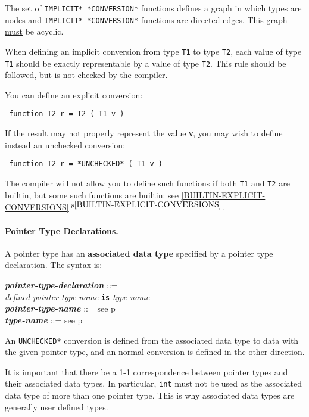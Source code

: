 \documentclass[12pt]{article}
\newcommand{\subsubsubsection}[1]{\paragraph[#1]{#1.}}
\newcommand{\TT}[1]{{\tt \bfseries #1}}
\newcommand{\key}[1]{{\rm \bfseries #1}}
\newcommand{\ttkey}[1]{{\tt \bfseries #1}}
\newcommand{\emkey}[1]{{\em \bfseries #1}}
\newcommand{\itemref}[1]{\ref{#1}$\,^{p\pageref{#1}}$}
\newcommand{\pagref}[1]{p\pageref{#1}}
\newenvironment{indpar}[1][0.3in]%
	{\begin{list}{}%
		     {\setlength{\itemsep}{0in}%
		      \setlength{\topsep}{0in}%
		      \setlength{\parsep}{1ex}%
		      \setlength{\labelwidth}{#1}%
		      \setlength{\leftmargin}{#1}%
		      \addtolength{\leftmargin}{\labelsep}}%
	 \item}%
	{\end{list}}
\begin{document}
The set of {\tt *IMPLICIT* *CONVERSION*} functions defines
a graph in which types are nodes and {\tt *IMPLICIT* *CONVERSION*}
functions are directed edges.  This graph \underline{must} be
acyclic.

When defining an implicit conversion from type {\tt T1} to type
{\tt T2}, each value of type {\tt T1} should be exactly representable
by a value of type {\tt T2}.  This rule should be followed, but
is not checked by the compiler.

You can define an explicit conversion:
\begin{indpar} \tt
function T2 r = T2 ( T1 v )
\end{indpar}
If the result may not properly represent the value {\tt v}, you
may wish to define instead an unchecked conversion:
\begin{indpar} \tt
function T2 r = *UNCHECKED* ( T1 v )
\end{indpar}
The compiler will not allow you to define such functions if both
{\tt T1} and {\tt T2} are builtin, but some such functions are
builtin: see \itemref{BUILTIN-EXPLICIT-CONVERSIONS}.





\subsubsubsection{Pointer Type Declarations}
\label{POINTER-TYPE-DECLARATIONS}

A pointer type has an
\key{associated data type}\label{POINTER-ASSOCIATE}
specified by a pointer type declaration.  The syntax is:

\begin{indpar}
\emkey{pointer-type-declaration}\label{POINTER-TYPE-DECLARATION} ::= \\
\hspace*{0.5in}\ttkey{pointer type} {\em defined-pointer-type-name}
	       \TT{is} {\em type-name}
\\[0.5ex]
\emkey{pointer-type-name} ::= see \pagref{POINTER-TYPE-NAME}
\\[0.5ex]
\emkey{type-name} ::= see \pagref{TYPE-NAME}
\end{indpar}
An {\tt *UNCHECKED*} conversion is defined from the associated data
type to data with the given pointer type, and an normal conversion
is defined in the other direction.

It is important that there be a 1-1 correspondence between
pointer types and their associated data types.  In particular,
{\tt int} must not be used as the associated data type of
more than one pointer type.  This is why associated data types
are generally user defined types.
\end{document}
